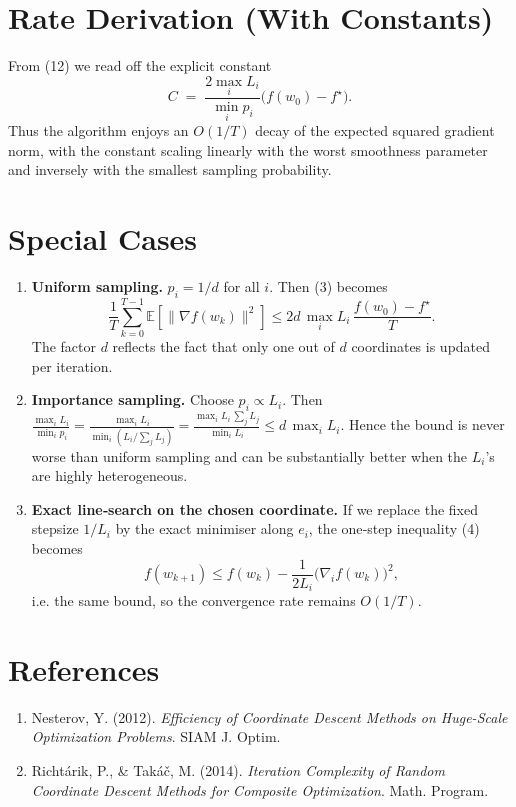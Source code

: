 \documentclass{article}
\newcommand{\E}{\mathbb{E}}
\begin{document}
\section*{Rate Derivation (With Constants)}
From (12) we read off the explicit constant
\[
C \;=\; \frac{2\max_i L_i}{\min_i p_i}\bigl( f(w_0)-f^\star \bigr) .
\]
Thus the algorithm enjoys an $O(1/T)$ decay of the expected squared
gradient norm, with the constant scaling linearly with the worst smoothness
parameter and inversely with the smallest sampling probability.

\section*{Special Cases}
\begin{enumerate}[label=(\alph*)]
\item \textbf{Uniform sampling.} $p_i=1/d$ for all $i$.
   Then (3) becomes
   \[
   \frac{1}{T}\sum_{k=0}^{T-1}\E[\|\nabla f(w_k)\|^2]
   \le 2d\,\max_i L_i\,
   \frac{f(w_0)-f^\star}{T}.
   \]
   The factor $d$ reflects the fact that only one out of $d$ coordinates is
   updated per iteration.

\item \textbf{Importance sampling.} Choose $p_i\propto L_i$.
   Then $\frac{\max_i L_i}{\min_i p_i}= \frac{\max_i L_i}{\min_i (L_i/\sum_j L_j)}
   = \frac{\max_i L_i\,\sum_j L_j}{\min_i L_i}
   \le d\,\max_i L_i$.
   Hence the bound is never worse than uniform sampling and can be
   substantially better when the $L_i$'s are highly heterogeneous.

\item \textbf{Exact line‑search on the chosen coordinate.}
   If we replace the fixed stepsize $1/L_i$ by the exact minimiser along $e_i$,
   the one‑step inequality (4) becomes
   \[
   f(w_{k+1}) \le f(w_k) - \frac{1}{2L_i}\bigl(\nabla_i f(w_k)\bigr)^2,
   \]
   i.e. the same bound, so the convergence rate remains $O(1/T)$.

\end{enumerate}

\section*{References}
\begin{enumerate}
\item Nesterov, Y. (2012). \emph{Efficiency of Coordinate Descent Methods on Huge-Scale Optimization Problems}. SIAM J. Optim.
\item Richtárik, P., & Takáč, M. (2014). \emph{Iteration Complexity of Random Coordinate Descent Methods for Composite Optimization}. Math. Program.
\end{enumerate}
\end{document}

